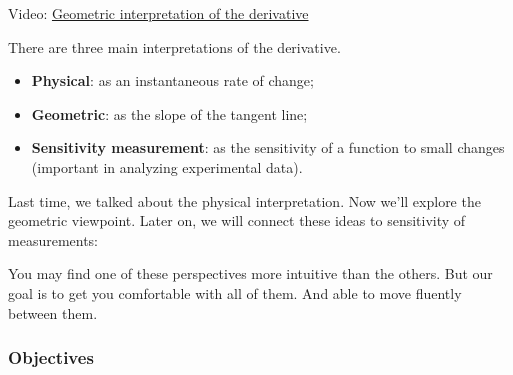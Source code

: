 \documentclass[pdftex, brazil, 12pt, twoside]{article}
\begin{document}
Video: \href{https://www.youtube.com/watch?v=-7NSDjdaHIc}{Geometric interpretation
  of the derivative}

There are three main interpretations
of the derivative.

\begin{itemize}[noitemsep]
\item \textbf{Physical}: as an instantaneous rate of change;
\item \textbf{Geometric}: as the slope of the tangent line;
\item \textbf{Sensitivity measurement}: as the sensitivity of a function to
  small changes (important in analyzing experimental data).
\end{itemize}

Last time, we talked about the physical interpretation.
Now we'll explore the geometric viewpoint.
Later on, we will connect these ideas
to sensitivity of measurements:

\begin{figure}[H]
  \begin{center}
  \end{center}
\end{figure}

You may find one of these perspectives
more intuitive than the others.
But our goal is to get you comfortable with all of them.
And able to move fluently between them.

\subsubsection{Objectives}
\label{u1-geometric-obj}
\end{document}
